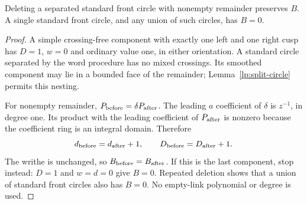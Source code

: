 \begin{lemma}\label{ng:circle}\leanok
Deleting a separated standard front circle with nonempty remainder
preserves $B$. A single standard front circle, and any union of such
circles, has $B=0$.

\end{lemma}
\begin{proof}\leanok{}
A simple crossing-free component with exactly one left and one right
cusp has $D=1$, $w=0$ and ordinary value one, in either orientation.
A standard circle separated by the word procedure has no mixed
crossings. Its smoothed component may lie in a bounded face of the
remainder; Lemma~\ref{lp:split-circle} permits this nesting.

For nonempty remainder, $P_{\rm before}=\delta P_{\rm after}$.
The leading $a$ coefficient of $\delta$ is $z^{-1}$, in degree one.
Its product with the leading coefficient of $P_{\rm after}$ is nonzero
because the coefficient ring is an integral domain. Therefore
\begin{equation}\label{ng:circle-counts}
 d_{\rm before}=d_{\rm after}+1,\qquad
 D_{\rm before}=D_{\rm after}+1.
\end{equation}
The writhe is unchanged, so $B_{\rm before}=B_{\rm after}$.
If this is the last component, stop instead: $D=1$ and $w=d=0$ give
$B=0$. Repeated deletion shows that a union of standard front circles
also has $B=0$. No empty-link polynomial or degree is used.
\end{proof}

